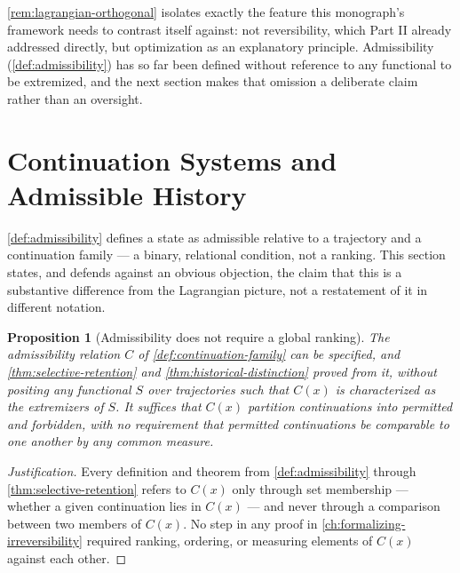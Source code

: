 \documentclass[11pt]{book}
\theoremstyle{plain}
\newtheorem{proposition}[theorem]{Proposition}
\theoremstyle{definition}
\theoremstyle{remark}
\begin{document}
\cref{rem:lagrangian-orthogonal} isolates exactly the feature this
monograph's framework needs to contrast itself against: not
reversibility, which Part II already addressed directly, but
optimization as an explanatory principle. Admissibility
(\cref{def:admissibility}) has so far been defined without reference
to any functional to be extremized, and the next section makes that
omission a deliberate claim rather than an oversight.

\section{Continuation Systems and Admissible History}

\cref{def:admissibility} defines a state as admissible relative to a
trajectory and a continuation family --- a binary, relational
condition, not a ranking. This section states, and defends against an
obvious objection, the claim that this is a substantive difference
from the Lagrangian picture, not a restatement of it in different
notation.

\begin{proposition}[Admissibility does not require a global ranking]
\label{prop:no-ranking-required}
The admissibility relation $C$ of \cref{def:continuation-family} can
be specified, and \cref{thm:selective-retention} and
\cref{thm:historical-distinction} proved from it, without positing any
functional $S$ over trajectories such that $C(x)$ is characterized as
the extremizers of $S$. It suffices that $C(x)$ partition
continuations into permitted and forbidden, with no requirement that
permitted continuations be comparable to one another by any common
measure.
\end{proposition}

\begin{proof}[Justification]
Every definition and theorem from \cref{def:admissibility} through
\cref{thm:selective-retention} refers to $C(x)$ only through
set membership --- whether a given continuation lies in $C(x)$ ---
and never through a comparison between two members of $C(x)$. No step
in any proof in \cref{ch:formalizing-irreversibility} required
ranking, ordering, or measuring elements of $C(x)$ against each other.
\end{proof}
\end{document}
